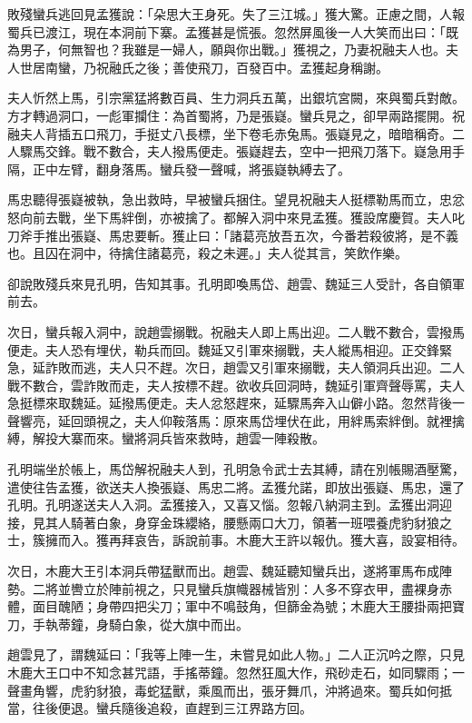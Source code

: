 敗殘蠻兵逃回見孟獲說：「朵思大王身死。失了三江城。」獲大驚。正慮之間，人報蜀兵已渡江，現在本洞前下寨。孟獲甚是慌張。忽然屏風後一人大笑而出曰：「既為男子，何無智也？我雖是一婦人，願與你出戰。」獲視之，乃妻祝融夫人也。夫人世居南蠻，乃祝融氏之後；善使飛刀，百發百中。孟獲起身稱謝。

夫人忻然上馬，引宗黨猛將數百員、生力洞兵五萬，出銀坑宮闕，來與蜀兵對敵。方才轉過洞口，一彪軍攔住：為首蜀將，乃是張嶷。蠻兵見之，卻早兩路擺開。祝融夫人背插五口飛刀，手挺丈八長標，坐下卷毛赤兔馬。張嶷見之，暗暗稱奇。二人驟馬交鋒。戰不數合，夫人撥馬便走。張嶷趕去，空中一把飛刀落下。嶷急用手隔，正中左臂，翻身落馬。蠻兵發一聲喊，將張嶷執縛去了。

馬忠聽得張嶷被執，急出救時，早被蠻兵捆住。望見祝融夫人挺標勒馬而立，忠忿怒向前去戰，坐下馬絆倒，亦被擒了。都解入洞中來見孟獲。獲設席慶賀。夫人叱刀斧手推出張嶷、馬忠要斬。獲止曰：「諸葛亮放吾五次，今番若殺彼將，是不義也。且囚在洞中，待擒住諸葛亮，殺之未遲。」夫人從其言，笑飲作樂。

卻說敗殘兵來見孔明，告知其事。孔明即喚馬岱、趙雲、魏延三人受計，各自領軍前去。

次日，蠻兵報入洞中，說趙雲搦戰。祝融夫人即上馬出迎。二人戰不數合，雲撥馬便走。夫人恐有埋伏，勒兵而回。魏延又引軍來搦戰，夫人縱馬相迎。正交鋒緊急，延詐敗而逃，夫人只不趕。次日，趙雲又引軍來搦戰，夫人領洞兵出迎。二人戰不數合，雲詐敗而走，夫人按標不趕。欲收兵回洞時，魏延引軍齊聲辱罵，夫人急挺標來取魏延。延撥馬便走。夫人忿怒趕來，延驟馬奔入山僻小路。忽然背後一聲響亮，延回頭視之，夫人仰鞍落馬：原來馬岱埋伏在此，用絆馬索絆倒。就裡擒縛，解投大寨而來。蠻將洞兵皆來救時，趙雲一陣殺散。

孔明端坐於帳上，馬岱解祝融夫人到，孔明急令武士去其縛，請在別帳賜酒壓驚，遣使往告孟獲，欲送夫人換張嶷、馬忠二將。孟獲允諾，即放出張嶷、馬忠，還了孔明。孔明遂送夫人入洞。孟獲接入，又喜又惱。忽報八納洞主到。孟獲出洞迎接，見其人騎著白象，身穿金珠纓絡，腰懸兩口大刀，領著一班喂養虎豹豺狼之士，簇擁而入。獲再拜哀告，訴說前事。木鹿大王許以報仇。獲大喜，設宴相待。

次日，木鹿大王引本洞兵帶猛獸而出。趙雲、魏延聽知蠻兵出，遂將軍馬布成陣勢。二將並轡立於陣前視之，只見蠻兵旗幟器械皆別：人多不穿衣甲，盡裸身赤體，面目醜陋；身帶四把尖刀；軍中不鳴鼓角，但篩金為號；木鹿大王腰掛兩把寶刀，手執蒂鐘，身騎白象，從大旗中而出。

趙雲見了，謂魏延曰：「我等上陣一生，未嘗見如此人物。」二人正沉吟之際，只見木鹿大王口中不知念甚咒語，手搖蒂鐘。忽然狂風大作，飛砂走石，如同驟雨；一聲畫角響，虎豹豺狼，毒蛇猛獸，乘風而出，張牙舞爪，沖將過來。蜀兵如何抵當，往後便退。蠻兵隨後追殺，直趕到三江界路方回。

